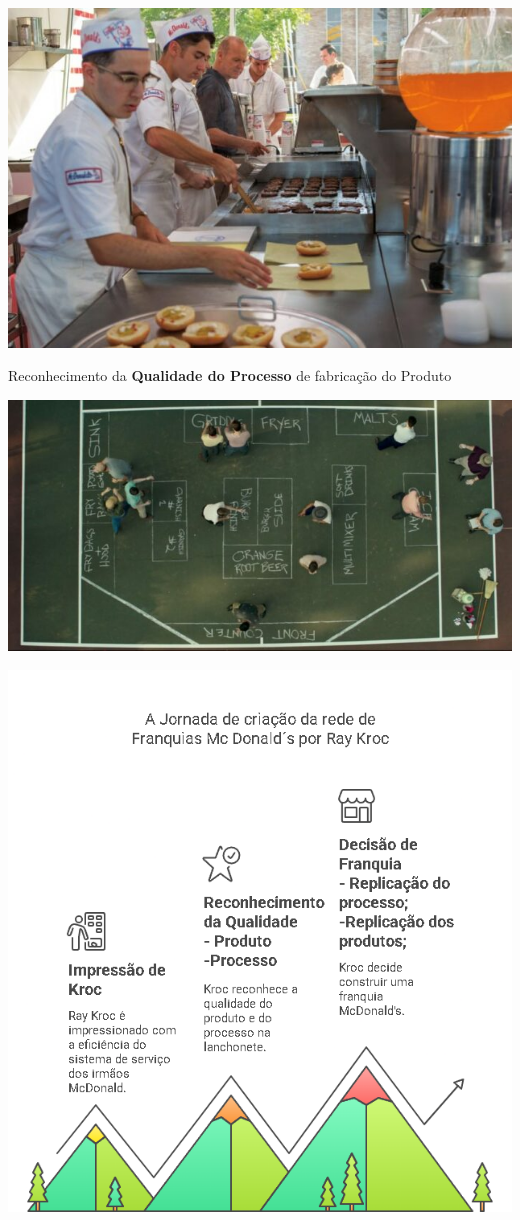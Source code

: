 \documentclass[
]{book}
\begin{document}
\includegraphics{images/mac-donalds/cozinha-mac.jpg}

Reconhecimento da \textbf{Qualidade do Processo} de fabricação do Produto

\includegraphics{images/mac-donalds/modelo-mac.jpg}

\includegraphics{images/qualidade-geral/MacDonalds1.png}
\end{document}
